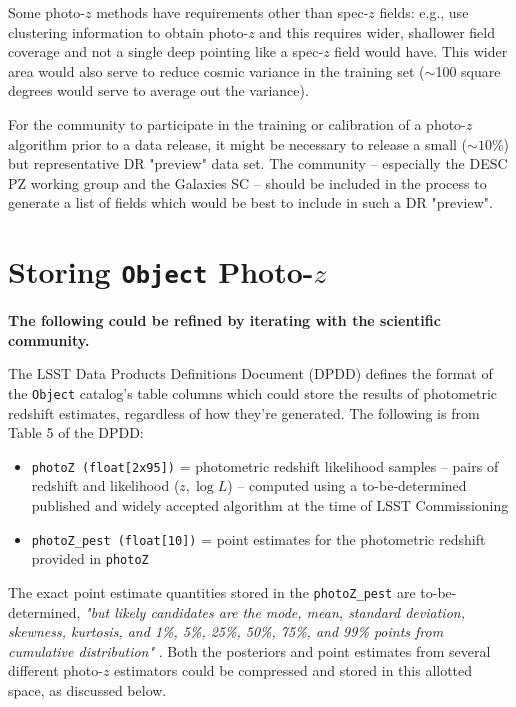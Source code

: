 \documentclass[DM,lsstdraft,toc]{lsstdoc}
\begin{document}
Some photo-$z$ methods have requirements other than spec-$z$ fields: e.g., \citet{2019MNRAS.483.2801S} use clustering information to obtain photo-$z$ and this requires wider, shallower field coverage and not a single deep pointing like a spec-$z$ field would have. 
This wider area would also serve to reduce cosmic variance in the training set ($\sim$100 square degrees would serve to average out the variance).

For the community to participate in the training or calibration of a photo-$z$ algorithm prior to a data release, it might be necessary to release a small ($\sim10\%$) but representative DR "preview" data set.
The community -- especially the DESC PZ working group and the Galaxies SC -- should be included in the process to generate a list of fields which would be best to include in such a DR "preview".


\section{Storing {\tt Object} Photo-$z$}\label{sec:store}

{\bf The following could be refined by iterating with the scientific community.}

The LSST Data Products Definitions Document (DPDD)  defines the format of the {\tt Object} catalog's table columns which could store the results of photometric redshift estimates, regardless of how they're generated. 
The following is from Table 5 of the DPDD:
\begin{itemize}[noitemsep,topsep=-10pt]
\item \texttt{photoZ (float[2x95])} = photometric redshift likelihood samples -- pairs of redshift and likelihood ($z,\log{L}$) -- computed using a to-be-determined published and widely accepted algorithm at the time of LSST Commissioning
\item \texttt{photoZ\_pest (float[10])} = point estimates for the photometric redshift provided in {\tt photoZ}
\end{itemize}

The exact point estimate quantities stored in the \texttt{photoZ\_pest} are to-be-determined, {\it "but likely candidates are the mode, mean, standard deviation, skewness, kurtosis, and 1\%, 5\%, 25\%, 50\%, 75\%, and 99\% points from cumulative distribution"} . 
Both the posteriors and point estimates from several different photo-$z$ estimators could be compressed and stored in this allotted space, as discussed below.
\end{document}
